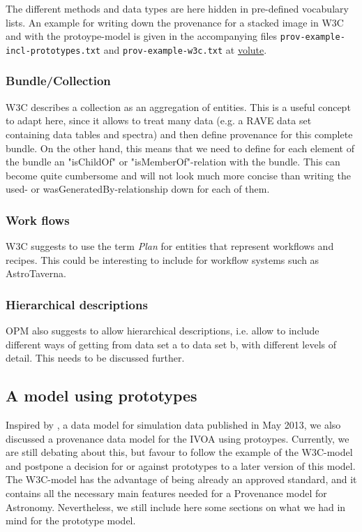 \documentclass[11pt,a4paper]{ivoa}
\begin{document}
The different methods and data types are here hidden in pre-defined vocabulary lists. 
An example for writing down the provenance for a stacked image in W3C and with the protoype-model is given in the accompanying files 
\texttt{prov-example-incl-prototypes.txt} and 
\texttt{prov-example-w3c.txt} at \href{https://volute.g-vo.org/svn/trunk/projects/dm/provenance/description/}{volute}.




\subsubsection{Bundle/Collection}
W3C describes a collection as an aggregation of entities. This is a useful concept to adapt here, since it allows to treat many data (e.g. a RAVE data set containing data tables and spectra) and then define provenance for this complete bundle.
On the other hand, this means that we need to define for each element of the bundle an "isChildOf" or "isMemberOf"-relation with the bundle.
This can become quite cumbersome and will not look much more concise than writing the used- or wasGeneratedBy-relationship down for each of them.




\subsubsection{Work flows}
W3C suggests to use the term \emph{Plan} for entities that represent workflows and recipes. This could be interesting to include for workflow systems such as AstroTaverna. 


\subsubsection{Hierarchical descriptions}
OPM also suggests to allow hierarchical descriptions, i.e. allow to include different ways of getting from data set a to data set b, with different levels of detail. 
This needs to be discussed further. 


\subsection{A model using prototypes}
Inspired by \cite{std:SimDM}, a data model for simulation data published in May 2013, we also discussed a provenance data model for the IVOA using protoypes. 
Currently, we are still debating about this, but favour to follow the example of the W3C-model and postpone a decision for or against prototypes to a later version of this model. 
The W3C-model has the advantage of being already an approved standard, and it contains all the necessary main features needed for a Provenance model for Astronomy. Nevertheless, we still include here some sections on what we had in mind for the prototype model. 
\end{document}
